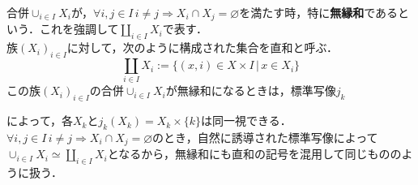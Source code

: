 \documentclass[uplatex, 12pt, dvipdfmx]{jsreport}
\begin{document}
\begin{definition}[無縁和と直和]
    合併$\cup_{i\in I}X_i$が，$\forall i,j\in I \, i\ne j\Rightarrow X_i\cap X_j=\varnothing$を満たす時，特に\textbf{無縁和}であるという．これを強調して$\coprod_{i\in I}X_i$で表す．\\
    族$(X_i)_{i\in I}$に対して，次のように構成された集合を直和と呼ぶ．
    $$\coprod_{i\in I}X_i := \{ (x,i)\in X\times I\, |\, x\in X_i \}$$
    この族$(X_i)_{i\in I}$の合併$\cup_{i\in I}X_i$が無縁和になるときは，標準写像$j_k$
    \begin{center}\end{center}
    によって，各$X_k$と$j_k(X_k)=X_k\times \{k\}$は同一視できる．$\forall i,j\in I\, i\ne j\Rightarrow X_i\cap X_j=\varnothing$のとき，自然に誘導された標準写像によって$\cup_{i\in I}X_i\simeq \coprod_{i\in I}X_i$となるから，無縁和にも直和の記号を混用して同じもののように扱う．
\end{definition}
\end{document}
